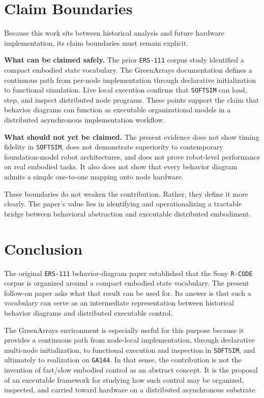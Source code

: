 \documentclass[11pt]{article}
\begin{document}
\section*{Claim Boundaries}

Because this work sits between historical analysis and future hardware
implementation, its claim boundaries must remain explicit.

\textbf{What can be claimed safely.} The prior \texttt{ERS-111} corpus
study identified a compact embodied state vocabulary. The GreenArrays
documentation defines a continuous path from per-node implementation
through declarative initialization to functional simulation. Live local
execution confirms that \texttt{SOFTSIM} can load, step, and inspect
distributed node programs. These points support the claim that behavior
diagrams can function as executable organizational models in a
distributed asynchronous implementation workflow.

\textbf{What should not yet be claimed.} The present evidence does not
show timing fidelity in \texttt{SOFTSIM}, does not demonstrate
superiority to contemporary foundation-model robot architectures, and
does not prove robot-level performance on real embodied tasks. It also
does not show that every behavior diagram admits a simple one-to-one
mapping onto node hardware.

These boundaries do not weaken the contribution. Rather, they define it
more clearly. The paper's value lies in identifying and operationalizing
a tractable bridge between behavioral abstraction and executable
distributed embodiment.

\section*{Conclusion}

The original \texttt{ERS-111} behavior-diagram paper established that
the Sony \texttt{R-CODE} corpus is organized around a compact embodied
state vocabulary. The present follow-on paper asks what that result can
be used for. Its answer is that such a vocabulary can serve as an
intermediate representation between historical behavior diagrams and
distributed executable control.

The GreenArrays environment is especially useful for this purpose
because it provides a continuous path from node-local implementation,
through declarative multi-node initialization, to functional execution
and inspection in \texttt{SOFTSIM}, and ultimately to realization on
\texttt{GA144}. In that sense, the contribution is not the invention of
fast/slow embodied control as an abstract concept. It is the proposal
of an executable framework for studying how such control may be
organized, inspected, and carried toward hardware on a distributed
asynchronous substrate.
\end{document}
